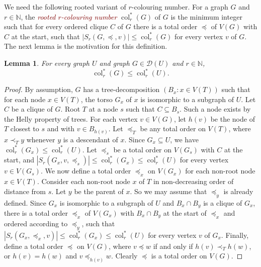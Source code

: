 \documentclass[a4paper,11pt]{article}
\newcommand{\defn}[1]{\textcolor{Maroon}{\emph{#1}}\index{#1}}
\theoremstyle{plain}
\newtheorem{lem}[thm]{Lemma}
\theoremstyle{definition}
\renewcommand{\leq}{\leqslant}
\DeclareMathOperator{\col}{col}
\newcommand{\sreach}{S}
\newcommand{\DD}{\mathcal{D}}
\newcommand{\NN}{\mathbb{N}}
\begin{document}
We need the following rooted variant of $r$-colouring number. For a graph $G$ and $r\in\NN$, the \defn{rooted $r$-colouring number} $\col^*_r(G)$ of $G$ is the minimum integer such that for every ordered clique $C$ of $G$ there is a total order $\preceq$ of $V(G)$ with $C$ at the start, such that $|\sreach_r(G,\preceq,v)| \leq \col^*_r(G)$ for every vertex $v$ of $G$. The next lemma is the motivation for this definition. 

\begin{lem}
\label{GenColourTreeDecomp}
For every graph $U$ and graph $G\in\DD(U)$ and $r\in\NN$, 
$$\col^*_r(G)\leq \col^*_r(U).$$
\end{lem}

\begin{proof}
By assumption, $G$ has a tree-decomposition $(B_x:x\in V(T))$ such that for each node $x\in V(T)$, the torso $G_x$ of $x$ is isomorphic to a subgraph of $U$. Let $C$ be a clique of $G$. 
Root $T$ at a node $s$ such that $C\subseteq B_s$. Such a node exists by the Helly property of trees. For each vertex $v\in V(G)$, let $h(v)$ be the node of $T$ closest to $s$ and with $v\in B_{h(v)}$. Let $\preceq_T$ be any total order on $V(T)$, where $x\prec_T y$ whenever $y$ is a descendant of $x$. Since $G_x\subseteq U$, we have $\col^*_r(G_x)\leq\col^*_r(U)$. 
Let $\preceq_s$ be a total order on $V(G_s)$ with $C$ at the start, and $|\sreach_r(G_x,v,\preceq_s)| \leq \col^*_r(G_x) \leq \col^*_r(U)$ for every vertex $v\in V(G_s)$. We now define a total order $\preceq_x$ on $V(G_x)$ for each non-root node $x\in V(T)$. Consider each non-root node $x$ of $T$ in non-decreasing order of distance from $s$. Let $y$ be the parent of $x$. So we may assume that $\preceq_y$ is already defined. Since $G_x$ is isomorphic to a subgraph of $U$ and $B_x\cap B_y$ is a clique of $G_x$, there is a total order $\preceq_x$ of $V(G_x)$ with $B_x\cap B_y$ at the start of $\preceq_x$ and ordered according to $\preceq_y$, such that $|\sreach_r(G_x,\preceq_x,v)| \leq \col^*_r(G_x) \leq \col^*_r(U)$ for every vertex $v$ of $G_x$. Finally, define a total order $\preceq$ on $V(G)$, where $v \preceq w$ if and only if $h(v) \prec_T h(w)$, or $h(v)=h(w)$ and $v\preceq_{h(v)} w$. Clearly $\preceq$ is a total order on $V(G)$.


\end{proof}
\end{document}
